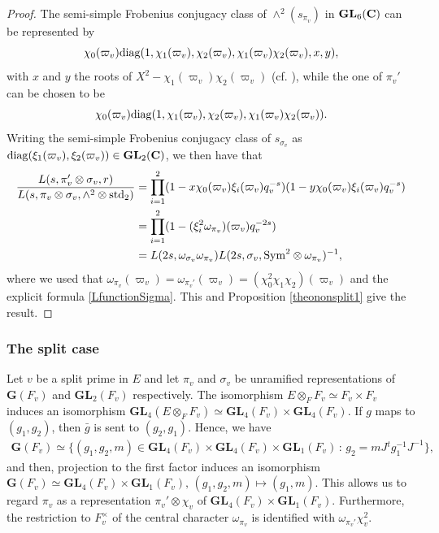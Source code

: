 \documentclass[11pt, reqno]{amsart}
\theoremstyle{plain}
\theoremstyle{definition}
\theoremstyle{remark}
\theoremstyle{plain}
\def\C{{\bf C}}
\def\G{\mathbf{G}}
\def\GL{\mathbf{GL}}
\begin{document}
\begin{proof}
The semi-simple Frobenius conjugacy class of $\wedge^2(s_{\pi_v})$ in $\GL_6(\C)$ can be represented by \[ \chi_0(\varpi_v) {\rm diag}(1,\chi_1(\varpi_v),\chi_2(\varpi_v),\chi_1(\varpi_v)\chi_2(\varpi_v), x , y ),\] with $x$ and $y$ the roots of $X^2 - \chi_1(\varpi_v)\chi_2(\varpi_v)$ (cf. \cite[p. 12]{KimK}), while the one of $\pi_v'$ can be chosen to be \[ \chi_0(\varpi_v) {\rm diag}(1,\chi_1(\varpi_v),\chi_2(\varpi_v),\chi_1(\varpi_v)\chi_2(\varpi_v)).\] Writing the semi-simple Frobenius conjugacy class of $s_{\sigma_v}$ as ${\rm diag}(\xi_1(\varpi_v),\xi_2(\varpi_v)) \in \GL_2(\C)$, we then have that \begin{align*}
     \frac{L(s,\pi_v' \otimes \sigma_v, r)}{L(s,\pi_v \otimes \sigma_v, \wedge^2 \otimes  \mathrm{std}_2)} &= \prod_{i=1}^2(1 - x\chi_0(\varpi_v)\xi_i(\varpi_v)q_v^{-s})(1 - y\chi_0(\varpi_v)\xi_i(\varpi_v) q_v^{-s}) \\ &= \prod_{i=1}^2(1 -(\xi_i^{2}\omega_{\pi_v})(\varpi_v) q_v^{-2s}) \\ &= L(2s,\omega_{\sigma_v} \omega_{\pi_v})L(2s,\sigma_v,{\rm Sym}^2\otimes \omega_{\pi_v})^{-1}  ,
 \end{align*} 
where we used that $\omega_{\pi_v}(\varpi_v) = \omega_{\pi_v'}(\varpi_v) =  (\chi_0^2\chi_1\chi_2)(\varpi_v)$ and the explicit formula \eqref{LfunctionSigma}. This and Proposition \ref{theononsplit1} give the result. 
\end{proof}




\subsubsection{The split case}
 
Let $v$ be a split prime in $E$ and let $\pi_v$ and $\sigma_v$ be unramified representations of $\G(F_v)$ and $\GL_2(F_v)$ respectively. The isomorphism $E \otimes_F F_v \simeq F_v \times F_v$ induces an isomorphism $\GL_4(E \otimes_F F_v  ) \simeq \GL_4(F_v) \times \GL_4( F_v)$. If $g$ maps to $(g_1,g_2)$, then $\bar{g}$ is sent to $(g_2,g_1)$. Hence, we have \begin{align*}
         \G(F_v)  \simeq  \{ (g_1 , g_2, m) \in \GL_4(F_v) \times \GL_4( F_v) \times \GL_1(F_v)\,:\, g_2 = m J {}^tg_1^{-1} J^{-1}  \},  
    \end{align*} and then, projection to the first factor induces an isomorphism  $\G(F_v)  \simeq  \GL_4( F_v ) \times \GL_1(F_v), \, (g_1, g_2, m) \mapsto (g_1,m)$. This allows us to regard $\pi_v$ as a representation $\pi_v' \otimes \chi_v$ of $\GL_4(F_v) \times \GL_1(F_v)$. Furthermore, the restriction to $F_v^\times$ of the central character $\omega_{\pi_v}$ is identified with $\omega_{\pi_v'}\chi_v^2$. 
    
\end{document}
